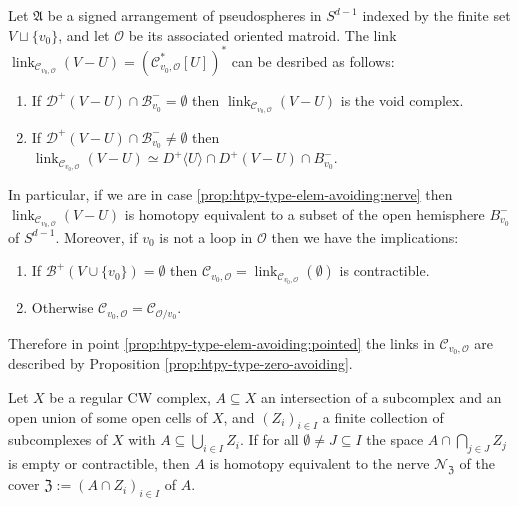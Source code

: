 \documentclass[10pt,a4paper]{amsart}
\DeclareMathOperator{\link}{\mathrm{link}}
\begin{document}
\begin{proposition}\label{prop:htpy-type-elem-avoiding}
    Let $\mathfrak{A}$ be a signed arrangement of pseudospheres in $S^{d-1}$ indexed by the finite set $V\sqcup\{v_0\}$, and let $\mathscr{O}$ be its associated oriented matroid. The link $\link_{\mathscr{C}_{v_0,\mathscr{O}}}(V-U)=(\mathscr{C}_{v_0,\mathscr{O}}^*[U])^*$ can be desribed as follows:
    \begin{enumerate}[label=\normalfont{(\arabic*)}]
        \item\label{prop:htpy-type-elem-avoiding:void} If $\mathscr{D}^+(V-U)\cap\mathscr{B}^-_{v_0}=\emptyset$ then $\link_{\mathscr{C}_{v_0,\mathscr{O}}}(V-U)$ is the void complex.
        \item\label{prop:htpy-type-elem-avoiding:nerve} If $\mathscr{D}^+(V-U)\cap\mathscr{B}^-_{v_0}\neq\emptyset$ then $\link_{\mathscr{C}_{v_0,\mathscr{O}}}(V-U)\simeq D^+\langle U\rangle\cap D^+(V-U)\cap B^-_{v_0}$.
    \end{enumerate}
    In particular, if we are in case \ref{prop:htpy-type-elem-avoiding:nerve} then $\link_{\mathscr{C}_{v_0,\mathscr{O}}}(V-U)$ is homotopy equivalent to a subset of the open hemisphere $B^-_{v_0}$ of $S^{d-1}$. Moreover, if $v_0$ is not a loop in $\mathscr{O}$ then we have the implications:
    \begin{enumerate}[label=\normalfont{(2.\arabic*)}]
        \item\label{prop:htpy-type-elem-avoiding:nonpointed} If $\mathscr{B}^+(V\cup\{v_0\})=\emptyset$ then $\mathscr{C}_{v_0,\mathscr{O}}=\link_{\mathscr{C}_{v_0,\mathscr{O}}}(\emptyset)$ is contractible.
        \item\label{prop:htpy-type-elem-avoiding:pointed} Otherwise $\mathscr{C}_{v_0,\mathscr{O}}=\mathscr{C}_{\mathscr{O}/v_0}$.
    \end{enumerate}
    Therefore in point \ref{prop:htpy-type-elem-avoiding:pointed} the links in $\mathscr{C}_{v_0,\mathscr{O}}$ are described by Proposition \ref{prop:htpy-type-zero-avoiding}.
\end{proposition}

\begin{theorem}\label{thm:nerve-closed-cellular}
    Let $X$ be a regular CW complex, $A\subseteq X$ an intersection of a subcomplex and an open union of some open cells of $X$, and $(Z_i)_{i\in I}$ a finite collection of subcomplexes of $X$ with $A\subseteq\bigcup_{i\in I}Z_i$. If for all $\emptyset\neq J\subseteq I$ the space $A\cap\bigcap_{j\in J}Z_j$ is empty or contractible, then $A$ is homotopy equivalent to the nerve $\mathscr{N}_{\mathfrak{Z}}$ of the cover $\mathfrak{Z}:=(A\cap Z_i)_{i\in I}$ of $A$.
\end{theorem}
\end{document}

